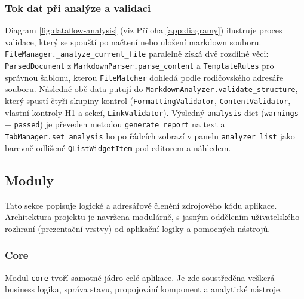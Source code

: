 \documentclass[12pt, a4paper]{article}
\begin{document}
\subsubsection*{Tok dat při analýze a validaci}

Diagram \ref{fig:dataflow-analysis} (viz Příloha \ref{app:diagramy}) ilustruje proces validace, který se 
spouští po načtení nebo uložení markdown souboru. \texttt{FileManager.\allowbreak \_analyze\_current\_file} 
paralelně získá dvě rozdílné věci: \texttt{ParsedDocument} z \texttt{MarkdownParser.\allowbreak parse\_content} 
a \texttt{TemplateRules} pro správnou šablonu, kterou \texttt{FileMatcher} dohledá podle rodičovského adresáře souboru. 
Následně obě data putují do \texttt{MarkdownAnalyzer.\allowbreak validate\_structure}, který spustí čtyři skupiny kontrol 
(\texttt{FormattingValidator}, \texttt{ContentValidator}, vlastní kontroly H1 a sekcí, \texttt{LinkValidator}). 
Výsledný \texttt{analysis} dict (\texttt{warnings} + \texttt{passed}) je převeden metodou \texttt{generate\_report} 
na text a \texttt{TabManager.\allowbreak set\_analysis} ho po řádcích zobrazí v panelu \texttt{analyzer\_list} 
jako barevně odlišené \texttt{QList\allowbreak Widget\allowbreak Item} pod editorem a náhledem.

\subsection{Moduly}

Tato sekce popisuje logické a adresářové členění zdrojového kódu aplikace. Architektura projektu je navržena modulárně, 
s jasným oddělením uživatelského rozhraní (prezentační vrstvy) od aplikační logiky a pomocných nástrojů. 

\subsubsection{Core}

Modul \texttt{core} tvoří samotné jádro celé aplikace. Je zde soustředěna veškerá business logika, správa stavu, 
propojování komponent a analytické nástroje.
\end{document}
